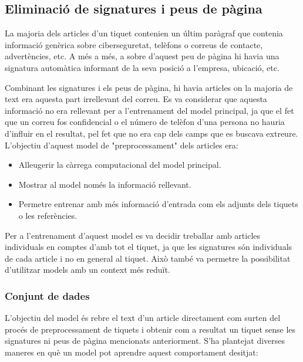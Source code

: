 \subsection{Eliminació de signatures i peus de pàgina}
La majoria dels articles d'un tiquet contenien un últim paràgraf que contenia informació genèrica sobre ciberseguretat, telèfons o correus de contacte, advertències, etc. A més a més, a sobre d'aquest peu de pàgina hi havia una signatura automàtica informant de la seva posició a l'empresa, ubicació, etc. 

Combinant les signatures i els peus de pàgina, hi havia articles on la majoria de text era aquesta part irrellevant del correu. Es va considerar que aquesta informació no era rellevant per a l'entrenament del model principal, ja que el fet que un correu fos confidencial o el número de telèfon d'una persona no hauria d'influir en el resultat, pel fet que no era cap dels camps que es buscava extreure. L'objectiu d'aquest model de "preprocessament" dels articles era:

\begin{itemize}
     \item Alleugerir la càrrega computacional del model principal.
     \item Mostrar al model només la informació rellevant.
     \item Permetre entrenar amb més informació d'entrada com els adjunts dels tiquets o les referències.
\end{itemize}

Per a l'entrenament d'aquest model es va decidir treballar amb articles individuals en comptes d'amb tot el tiquet, ja que les signatures són individuals de cada article i no en general al tiquet. Això també va permetre la possibilitat d'utilitzar models amb un context més reduït.

\subsubsection{Conjunt de dades}
L'objectiu del model és rebre el text d'un article directament com surten del procés de preprocessament de tiquets i obtenir com a resultat un tiquet sense les signatures ni peus de pàgina mencionats anteriorment. S'ha plantejat diverses maneres en què un model pot aprendre aquest comportament desitjat:

